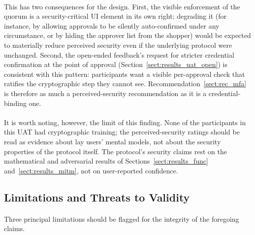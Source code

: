 \paragraph{}This has two consequences for the design. First, the visible enforcement of the quorum is a security-critical UI element in its own right; degrading it (for instance, by allowing approvals to be silently auto-confirmed under any circumstance, or by hiding the approver list from the shopper) would be expected to materially reduce perceived security even if the underlying protocol were unchanged. Second, the open-ended feedback's request for stricter credential confirmation at the point of approval (Section~\ref{sect:results_uat_open}) is consistent with this pattern: participants want a visible per-approval check that ratifies the cryptographic step they cannot see. Recommendation~\ref{sect:rec_mfa} is therefore as much a perceived-security recommendation as it is a credential-binding one.

\paragraph{}It is worth noting, however, the limit of this finding. None of the participants in this UAT had cryptographic training; the perceived-security ratings should be read as evidence about lay users' mental models, not about the security properties of the protocol itself. The protocol's security claims rest on the mathematical and adversarial results of Sections~\ref{sect:results_func} and~\ref{sect:results_mitm}, not on user-reported confidence.

\subsection{Limitations and Threats to Validity}
\label{sect:disc_limits}

\paragraph{}Three principal limitations should be flagged for the integrity of the foregoing claims.

